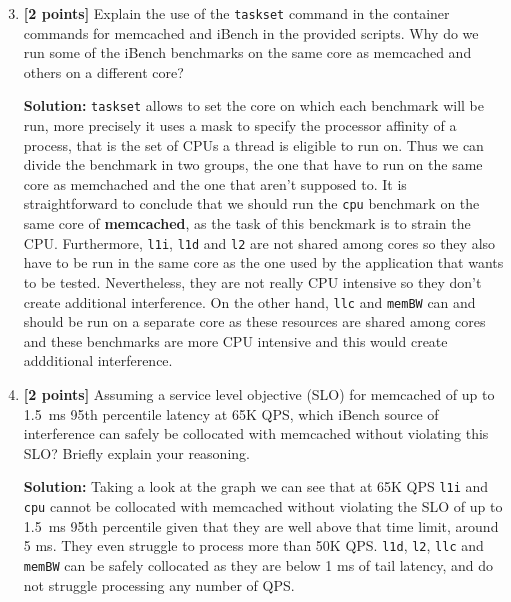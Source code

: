 \begin{enumerate}[label=(\alph*)]
    \setcounter{enumi}{2}
    
    \item \textbf{[2 points]} Explain the use of the \texttt{taskset} command in the container commands for memcached and iBench in the provided scripts. Why do we run some of the iBench benchmarks on the same core as memcached and others on a different core?

    
     \textbf{Solution:} \texttt{taskset} allows to set the core on which each benchmark will be run, more precisely it uses a mask to specify the processor affinity of a process, that is the set of CPUs a thread is eligible to run on. Thus we can divide the benchmark in two groups, the one that have to run on the same core as memchached and the one that aren't supposed to. It is straightforward to conclude that we should run the \texttt{cpu} benchmark on the same core of \textbf{memcached}, as the task of this benckmark is to strain the CPU. Furthermore, \texttt{l1i}, \texttt{l1d} and \texttt{l2} are not shared among cores so they also have to be run in the same core as the one used by the application that wants to be tested. Nevertheless, they are not really CPU intensive so they don't create additional interference. On the other hand, \texttt{llc} and \texttt{memBW} can and should be run on a separate core as these resources are shared among cores and these benchmarks are more CPU intensive and this would create addditional interference.
    
\end{enumerate}


    
\begin{enumerate}[label=(\alph*)]
    \setcounter{enumi}{3}
    
    \item \textbf{[2 points]} Assuming a service level objective (SLO) for memcached of up to 1.5~ms 95th percentile latency at 65K QPS, which iBench source of interference can safely be collocated with memcached without violating this SLO? Briefly explain your reasoning.

    \textbf{Solution:} Taking a look at the graph we can see that at 65K QPS \texttt{l1i} and \texttt{cpu} cannot be collocated with memcached without violating the SLO of up to 1.5~ms 95th percentile given that they are well above that time limit, around 5 ms. They even struggle to process more than 50K QPS. \texttt{l1d},  \texttt{l2}, \texttt{llc} and \texttt{memBW} can be safely collocated as they are below 1 ms of tail latency, and do not struggle processing any number of QPS.
            
\end{enumerate}

